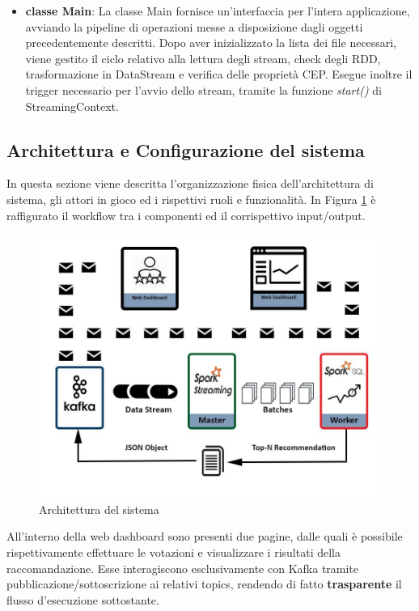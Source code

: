 \documentclass[12pt]{article}
\begin{document}
\begin{itemize}
	\item \textbf{classe Main}: La classe Main fornisce un'interfaccia per l'intera applicazione, avviando la pipeline di operazioni messe a disposizione dagli oggetti precedentemente descritti. Dopo aver inizializzato la lista dei file necessari, viene gestito il ciclo relativo alla lettura degli stream, check degli RDD, trasformazione in DataStream e verifica delle proprietà CEP. Esegue inoltre il trigger necessario per l'avvio dello stream, tramite la funzione \textit{start()} di StreamingContext.
\end{itemize}

\subsection {Architettura e Configurazione del sistema}

In questa sezione viene descritta l'organizzazione fisica dell'architettura di sistema, gli attori in gioco ed i rispettivi ruoli e funzionalità. In Figura \ref{cephw} è raffigurato il workflow tra i componenti ed il corrispettivo input/output.


\begin{figure}[H]
	\centering
	\includegraphics[scale=0.50]{images/cephw.png}
	\caption{Architettura del sistema}
	\label{cephw}
\end{figure}

All'interno della web dashboard sono presenti due pagine, dalle quali è possibile rispettivamente effettuare le votazioni e visualizzare i risultati della raccomandazione. Esse interagiscono esclusivamente con Kafka tramite pubblicazione/sottoscrizione ai relativi topics, rendendo di fatto \textbf{trasparente} il flusso d'esecuzione sottostante. \\
\end{document}
